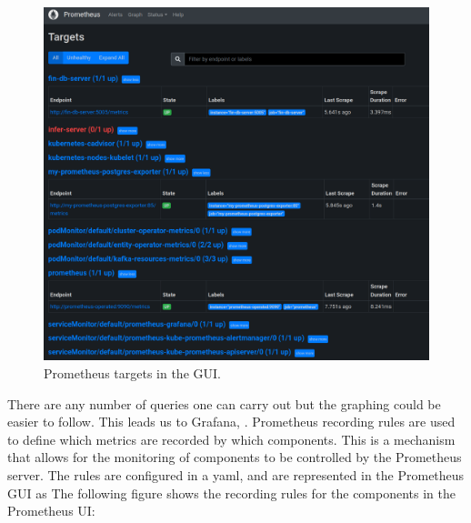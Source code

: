 \begin{figure}[H]
	\centering
	\includegraphics[width=1\linewidth]{figures/prom_targets.png}
	\caption{Prometheus targets in the GUI.}
	\label{fig:prom_targets}
\end{figure}
There are any number of queries one can carry out but the graphing could be easier to follow. This leads us to Grafana, .
\bigbreak
Prometheus recording rules are used to define which metrics are recorded by which components. This is a mechanism that allows for the monitoring of
components to be controlled by the Prometheus server. The rules are configured in a yaml,  and are represented
in the Prometheus GUI as  The following figure shows the recording rules for the components in the Prometheus UI:
